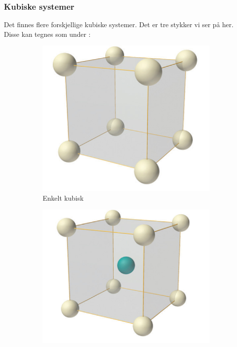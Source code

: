 \documentclass{article}
\begin{document}
\subsubsection{Kubiske systemer}
Det finnes flere forskjellige kubiske systemer. Det er tre stykker vi ser på her. Disse kan tegnes som under \cite{kubiske_systemer}:
\begin{figure}[h!]
  \centering
  \begin{subfigure}{0.3\textwidth}
    \includegraphics[width=\linewidth]{bilder/enkelt_kubisk.png}
    \caption{Enkelt kubisk}
    \label{fig:enkelt_kubisk}
  \end{subfigure}
  \begin{subfigure}{0.3\textwidth}
    \includegraphics[width=\linewidth]{bilder/romsentert_kubisk.png}

\end{subfigure}
\end{figure}
\end{document}
